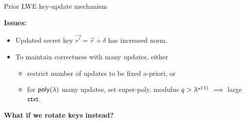 \documentclass[xcolor=table,10pt,aspectratio=169]{beamer}
\begin{document}
\begin{frame}{Prior LWE key-update mechanism~\cite{TCC:DodKarWic21}}
  \begin{figure}
    \centering
    \begin{pchstack}[boxed]

      \pchspace

    \end{pchstack}
  \end{figure}
  \vfill
  \pause
  \textbf{Issues:}
  \begin{itemize}[label=\textbullet]
    \item Updated secret key \(\vec{r'} = \vec{r} + \delta\) has increased norm.
      \vfill
    \item To maintain correctness with many updates, either 
      \begin{itemize}[label=\textendash]
        \item restrict number of updates to be fixed a-priori, or 
        \item for \(\poly[\secpar]\) many updates, set super-poly. modulus \(q > \lambda^{\omega(1)}\) \(\implies\) large \(\mathsf{ctxt}\).
      \end{itemize}
  \end{itemize}
\end{frame}

\begin{frame}
  \centering
  \textbf{What if we rotate keys instead?}
\end{frame}
\end{document}
